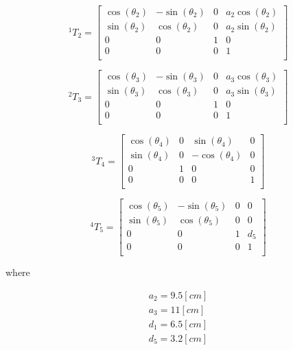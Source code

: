 \documentclass{article}
\renewcommand{\c}[1]{\cos(\theta_{#1})}
\newcommand{\s}[1]{\sin(\theta_{#1})}
\newcommand{\T}[2]{{}^{#1}T_{#2}}
\begin{document}
\begin{equation}
\label{eq:forward.t_12}
\T{1}{2} =\left[
\begin{array}{cccc}
	\c{2} & -\s{2} & 0 & a_2\c{2} \\
	\s{2} & \c{2} & 0 & a_2\s{2}  \\
	0 & 0 & 1 & 0 \\
	0 & 0 & 0 & 1 \\
\end{array}
\right]
\end{equation}

\begin{equation}
\label{eq:forward.t_23}
\T{2}{3} =\left[
\begin{array}{cccc}
	\c{3} & -\s{3} & 0 & a_3\c{3} \\
	\s{3} & \c{3} & 0 & a_3\s{3}  \\
	0 & 0 & 1 & 0 \\
	0 & 0 & 0 & 1 \\
\end{array}
\right]
\end{equation}

\begin{equation}
\label{eq:forward.t_34}
\T{3}{4} = \left[
\begin{array}{cccc}
	\c{4} & 0 & \s{4} & 0 \\
	\s{4} & 0 & -\c{4} & 0 \\
	0 & 1 & 0 & 0 \\
	0 & 0 & 0 & 1 \\
\end{array}
\right]
\end{equation}

\begin{equation}
\label{eq:forward.t_45}
\T{4}{5} =\left[
\begin{array}{cccc}
	\c{5} & -\s{5} & 0 & 0 \\
	\s{5} & \c{5} & 0 & 0  \\
	0 & 0 & 1 & d_5\\
	0 & 0 & 0 & 1 \\
\end{array}
\right]
\end{equation}

where

\begin{align*}
a_2 = 9.5 [cm] \\
a_3 = 11 [cm] \\
d_1 = 6.5 [cm] \\
d_5 = 3.2 [cm]
\end{align*}
\end{document}
